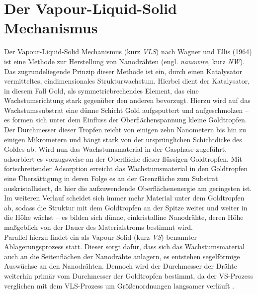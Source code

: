 \section{Der Vapour-Liquid-Solid Mechanismus}
\label{VLS}
Der Vapour-Liquid-Solid Mechanismus (kurz \textit{VLS}) nach Wagner und Ellis (1964) \cite{Wagner.1964} ist eine Methode zur Herstellung von Nanodrähten (engl. \textit{nanowire}, kurz \textit{NW}). Das zugrundeliegende Prinzip dieser Methode ist ein, durch einen Katalysator vermitteltes, eindimensionales Strukturwachstum. Hierbei dient der Katalysator, in diesem Fall Gold, als symmetriebrechendes Element, das eine Wachstumsrichtung stark gegenüber den anderen bevorzugt. Hierzu wird auf das Wachstumssubstrat eine dünne Schicht Gold aufgsputtert und aufgeschmolzen – es formen sich unter dem Einfluss der Oberflächenspannung kleine Goldtropfen. Der Durchmesser dieser Tropfen reicht von einigen zehn Nanometern bis hin zu einigen Mikrometern und hängt stark von der ursprünglichen Schichtdicke des Goldes ab. Wird nun das Wachstumsmaterial in der Gasphase zugeführt, adsorbiert es vorzugsweise an der Oberfläche dieser flüssigen Goldtropfen. Mit fortschreitender Adsorption erreicht das Wachstumsmaterial in den Goldtropfen eine Übersättigung in deren Folge es an der Grenzfläche zum Substrat auskristallisiert, da hier die aufzuwendende Oberflächenenergie am geringsten ist. Im weiteren Verlauf scheidet sich immer mehr Material unter dem Goldtropfen ab, sodass die Struktur mit dem Goldtropfen an der Spitze weiter und weiter in die Höhe wächst – es bilden sich dünne, einkristalline Nanodrähte, deren Höhe maßgeblich von der Dauer des Materialstroms bestimmt wird.\\
Parallel hierzu findet ein als Vapour-Solid (kurz \textit{VS}) benannter Ablagerungsprozess statt. Dieser sorgt dafür, dass sich das Wachstumsmaterial auch an die Seitenflächen der Nanodrähte anlagern, es entstehen segelförmige Auswüchse an den Nanodrähten. Dennoch wird der Durchmesser der Drähte weiterhin primär vom Durchmesser der Goldtropfen bestimmt, da der VS-Prozess verglichen mit dem VLS-Prozess um Größenordnungen langsamer verläuft \cite{Geburt.Diss}.

